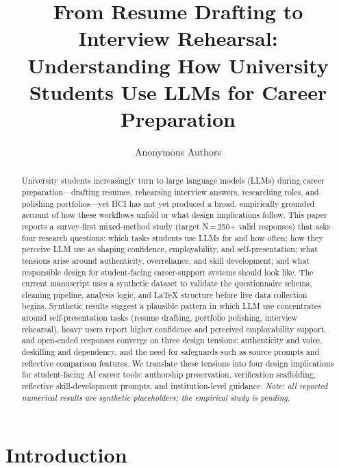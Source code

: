 \documentclass[sigconf,review,anonymous]{acmart}
\title{From Resume Drafting to Interview Rehearsal: Understanding How University Students Use LLMs for Career Preparation}
\author{Anonymous Authors}
\affiliation{%
  \institution{Anonymous Institution}
  \city{Anonymous City}
  \country{Anonymous Country}
}
\begin{document}

\begin{abstract}
University students increasingly turn to large language models (LLMs) during career preparation---drafting resumes, rehearsing interview answers, researching roles, and polishing portfolios---yet HCI has not yet produced a broad, empirically grounded account of how these workflows unfold or what design implications follow. This paper reports a survey-first mixed-method study (target N\,=\,250+ valid responses) that asks four research questions: which tasks students use LLMs for and how often; how they perceive LLM use as shaping confidence, employability, and self-presentation; what tensions arise around authenticity, overreliance, and skill development; and what responsible design for student-facing career-support systems should look like. The current manuscript uses a synthetic dataset to validate the questionnaire schema, cleaning pipeline, analysis logic, and LaTeX structure before live data collection begins. Synthetic results suggest a plausible pattern in which LLM use concentrates around self-presentation tasks (resume drafting, portfolio polishing, interview rehearsal), heavy users report higher confidence and perceived employability support, and open-ended responses converge on three design tensions: authenticity and voice, deskilling and dependency, and the need for safeguards such as source prompts and reflective comparison features. We translate these tensions into four design implications for student-facing AI career tools: authorship preservation, verification scaffolding, reflective skill-development prompts, and institution-level guidance. \emph{Note: all reported numerical results are synthetic placeholders; the empirical study is pending.}
\end{abstract}

\maketitle

\section{Introduction}
\end{document}
